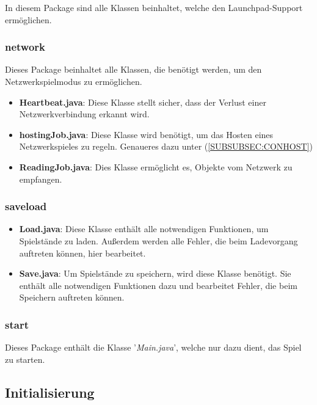 \documentclass[12pt,a4paper]{article}
\begin{document}
In diesem Package sind alle Klassen beinhaltet, welche den Launchpad-Support ermöglichen. 

\subsubsection{network}

Dieses Package beinhaltet alle Klassen, die benötigt werden, um den Netzwerkspielmodus zu ermöglichen.

\begin{itemize}
	\item{\textbf{Heartbeat.java}: Diese Klasse stellt sicher, dass der Verlust einer Netzwerkverbindung erkannt wird.}
	\item{\textbf{hostingJob.java}: Diese Klasse wird benötigt, um das Hosten eines Netzwerkspieles zu regeln. Genaueres dazu unter (\ref{SUBSUBSEC:CONHOST})} %
	\item{\textbf{ReadingJob.java}: Dies Klasse ermöglicht es, Objekte vom Netzwerk zu empfangen. }
\end{itemize}

\subsubsection{saveload}

\begin{itemize}

	\item{\textbf{Load.java}: Diese Klasse enthält alle notwendigen Funktionen, um Spielstände zu laden. Außerdem werden alle Fehler, die beim Ladevorgang auftreten können, hier bearbeitet.  }
	
	\item{\textbf{Save.java}: Um Spielstände zu speichern, wird diese Klasse benötigt. Sie enthält alle notwendigen Funktionen dazu und bearbeitet Fehler, die beim Speichern auftreten können. }


\end{itemize}

\subsubsection{start}

Dieses Package enthält die Klasse '\textit{Main.java}', welche nur dazu dient, das Spiel zu starten.

\newpage
\subsection{Initialisierung}
\label{SUBSEC:INIT}
\end{document}
